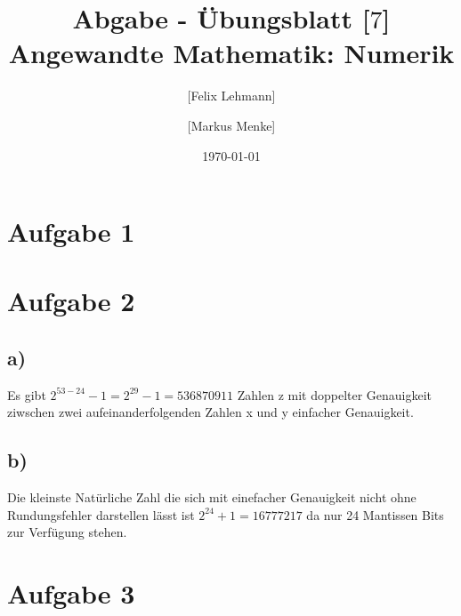 \documentclass[10pt,a4paper]{article}
\begin{document}
\title{Abgabe - Übungsblatt [$7$]\\
\small{Angewandte Mathematik: Numerik}}
\author{ [Felix Lehmann] \and [Markus Menke]}
\date{\today}
\maketitle

\section*{Aufgabe 1}


\section*{Aufgabe 2}
\subsection*{a)}
Es gibt $2^{53-24}-1=2^{29}-1=536870911$ Zahlen z mit doppelter Genauigkeit ziwschen zwei aufeinanderfolgenden Zahlen x und y einfacher Genauigkeit.
\subsection*{b)}
Die kleinste Natürliche Zahl die sich mit einefacher Genauigkeit nicht ohne Rundungsfehler darstellen lässt ist $2^{24}+1 = 16777217$ da nur 24 Mantissen Bits zur Verfügung stehen.

\section*{Aufgabe 3}
\end{document}
